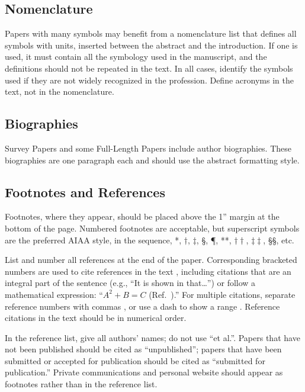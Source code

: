 \documentclass[journal ]{new-aiaa}
\begin{document}
\subsection{Nomenclature}
Papers with many symbols may benefit from a nomenclature list that defines all symbols with units, inserted between the abstract and the introduction. If one is used, it must contain all the symbology used in the manuscript, and the definitions should not be repeated in the text. In all cases, identify the symbols used if they are not widely recognized in the profession. Define acronyms in the text, not in the nomenclature. 

\subsection{Biographies}
Survey Papers and some Full-Length Papers include author biographies. These biographies are one paragraph each and should use the abstract formatting style.

\subsection{Footnotes and References}
Footnotes, where they appear, should be placed above the 1'' margin at the bottom of the page. Numbered footnotes are acceptable, but superscript symbols are the preferred AIAA style, in the sequence, *, $\dag$, $\ddag$, \S, \P, **, $\dag\dag$, $\ddag\ddag$, \S\S, etc.

List and number all references at the end of the paper. Corresponding bracketed numbers are used to cite references in the text \cite{vatistas1986reverse}, including citations that are an integral part of the sentence (e.g., ``It is shown in \cite{dornheim1996planetary} that\ldots '') or follow a mathematical expression: ``$A^{2} + B = C$ (Ref.~\cite{terster1997nasa}).'' For multiple citations, separate reference numbers with commas \cite{peyret2012computational,oates1997aerothermodynamics}, or use a dash to show a range \cite{volpe1994techniques,thompsonspacecraft,chi1993fluid,brandis2016nonequi}. Reference citations in the text should be in numerical order. 

In the reference list, give all authors' names; do not use ``et al.''. Papers that have not been published should be cited as ``unpublished''; papers that have been submitted or accepted for publication should be cited as ``submitted for publication.'' Private communications and personal website should appear as footnotes rather than in the reference list.
\end{document}
